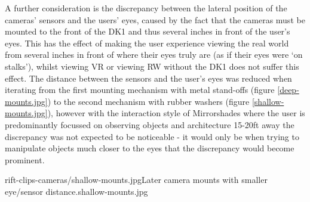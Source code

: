 A further consideration is the discrepancy between the lateral position of the cameras' sensors and the users' eyes, caused by the fact that the cameras must be mounted to the front of the DK1 and thus several inches in front of the user's eyes. This has the effect of making the user experience viewing the real world from several inches in front of where their eyes truly are (as if their eyes were `on stalks'), whilst viewing VR or viewing RW without the DK1 does not suffer this effect. The distance between the sensors and the user's eyes was reduced when iterating from the first mounting mechanism with metal stand-offs (figure \ref{deep-mounts.jpg}) to the second mechanism with rubber washers (figure \ref{shallow-mounts.jpg}), however with the interaction style of Mirrorshades where the user is predominantly focussed on observing objects and architecture 15-20ft away the discrepancy was not expected to be noticeable - it would only be when trying to manipulate objects much closer to the eyes that the discrepancy would become prominent.

       {rift-clips-cameras/shallow-mounts.jpg}{Later camera mounts with smaller eye/sensor distance.}{shallow-mounts.jpg}






